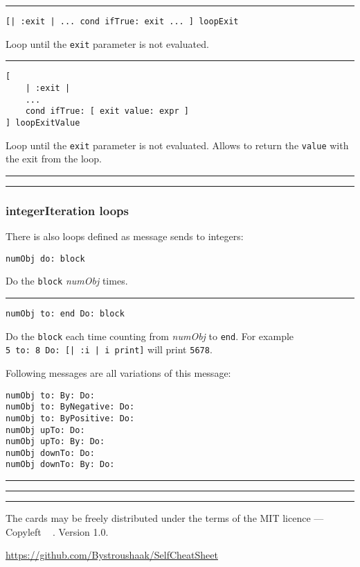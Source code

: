 \documentclass[10pt]{article}
\begin{document}
\begin{multicols*}{3}
\vspace*{0.2cm}
\hrule

\begin{lstlisting}
[| :exit | ... cond ifTrue: exit ... ] loopExit
\end{lstlisting}
Loop until the \texttt{exit} parameter is not evaluated.

\vspace*{0.2cm}
\hrule

\begin{lstlisting}
[
    | :exit |
    ...
    cond ifTrue: [ exit value: expr ]
] loopExitValue
\end{lstlisting}
Loop until the \texttt{exit} parameter is not evaluated. Allows to return the \texttt{value} with the exit from the loop.

\vspace{0.2cm}
\hrule
\vspace{0.03cm}
\hrule

\subsubsection{integerIteration loops}

There is also loops defined as message sends to integers:

\begin{lstlisting}
numObj do: block
\end{lstlisting}

Do the \texttt{block} \textit{numObj} times.

\vspace*{0.2cm}
\hrule

\begin{lstlisting}
numObj to: end Do: block
\end{lstlisting}

Do the \texttt{block} each time counting from \textit{numObj} to \texttt{end}. For example \texttt{5\ to:\ 8\ Do:\ [|\ :i\ |\ i\ print]} will print \texttt{5678}.

Following messages are all variations of this message:

\begin{lstlisting}
numObj to: By: Do:
numObj to: ByNegative: Do:
numObj to: ByPositive: Do:
numObj upTo: Do:
numObj upTo: By: Do:
numObj downTo: Do:
numObj downTo: By: Do:
\end{lstlisting}

\vspace*{0.2cm}
\hrule
\vspace*{0.03cm}
\hrule




\vfill
\hrule
\smallskip

{\small
The cards may be freely distributed under
the terms of the MIT licence ---
Copyleft \textcopyleft\ \thedate{} \href{http://kitakitsune.org}{\theauthor}. Version 1.0.

\url{https://github.com/Bystroushaak/SelfCheatSheet}
}

\end{multicols*}
\end{document}
